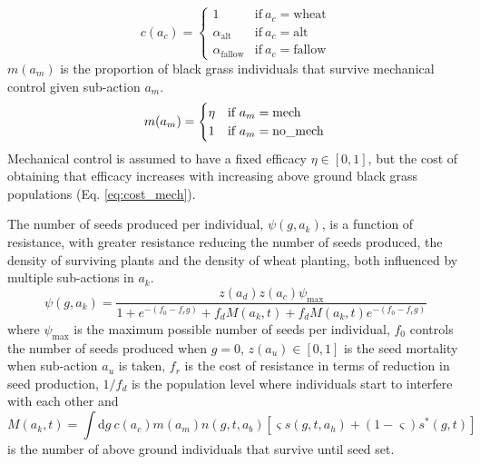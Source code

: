 \documentclass[12pt, a4paper]{article}
\begin{document}
\begin{equation}
	c(a_c) = \begin{cases}
		1 &\text{if}~a_c = \text{wheat}\\
		\alpha_\text{alt} &\text{if}~a_c = \text{alt}\\
		\alpha_\text{fallow} &\text{if}~a_c = \text{fallow}
	\end{cases} 
\end{equation} 
$m(a_m)$ is the proportion of black grass individuals that survive mechanical control given sub-action $a_m$.
\begin{equation}
	m(a_m) = \begin{cases}
		\eta &\text{if}~a_m = \text{mech}\\
		1 &\text{if}~a_m = \text{no\_mech}
	\end{cases}\\
\end{equation}
Mechanical control is assumed to have a fixed efficacy $\eta \in [0, 1]$, but the cost of obtaining that efficacy increases with increasing above ground black grass populations (Eq. \ref{eq:cost_mech}).

The number of seeds produced per individual, $\psi(g, a_k)$, is a function of resistance, with greater resistance reducing the number of seeds produced, the density of surviving plants and the density of wheat planting, both influenced by multiple sub-actions in $a_k$. 
\begin{equation}\label{eq:seed_production}
	\psi(g, a_k) = \frac{z(a_d)z(a_c)\psi_\text{max}}{1 + e^{-(f_0 - f_rg)} + f_d M(a_k, t) + f_dM(a_k, t) e^{-(f_0 - f_rg)}}
\end{equation}  
where $\psi_\text{max}$ is the maximum possible number of seeds per individual, $f_0$ controls the number of seeds produced when $g = 0$, $z(a_u) \in [0, 1]$ is the seed mortality when sub-action $a_u$ is taken, $f_r$ is the cost of resistance in terms of reduction in seed production, $1/f_d$ is the population level where individuals start to interfere with each other and 
\begin{equation}\label{eq:num_ind}
	M(a_k, t) = \int \text{d}g~c(a_c)m(a_m)n(g, t, a_b)\left[\varsigma s(g,t,a_h) + (1 - \varsigma)s^*(g, t)\right]   
\end{equation}
is the number of above ground individuals that survive until seed set.
\end{document}
